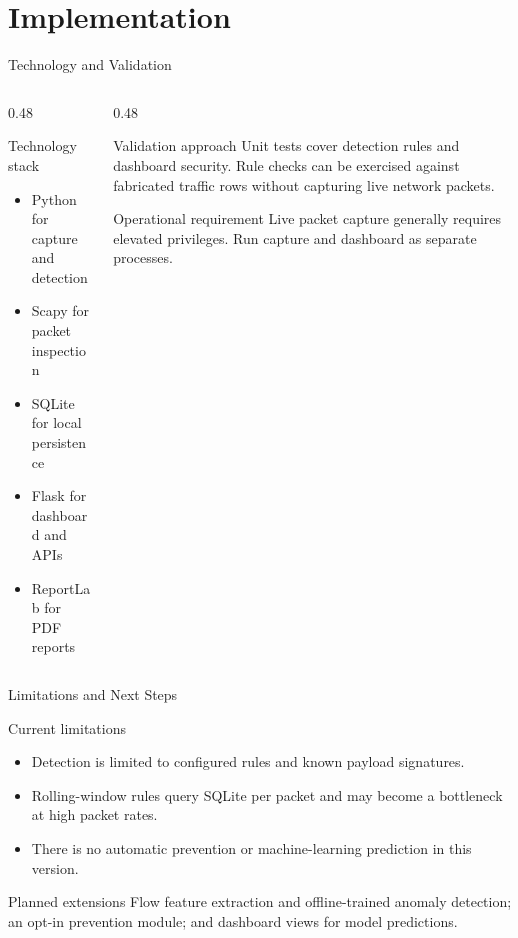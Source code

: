 \documentclass{SKP-beamer}
\begin{document}
\section{Implementation}
\begin{frame}{Technology and Validation}
\begin{columns}[T]
\begin{column}{0.48\textwidth}
\begin{block}{Technology stack}
\begin{itemize}
  \item Python for capture and detection
  \item Scapy for packet inspection
  \item SQLite for local persistence
  \item Flask for dashboard and APIs
  \item ReportLab for PDF reports
\end{itemize}
\end{block}
\end{column}
\begin{column}{0.48\textwidth}
\begin{block}{Validation approach}
Unit tests cover detection rules and dashboard security. Rule checks can be exercised against fabricated traffic rows without capturing live network packets.
\end{block}
\begin{alertblock}{Operational requirement}
Live packet capture generally requires elevated privileges. Run capture and dashboard as separate processes.
\end{alertblock}
\end{column}
\end{columns}
\end{frame}

\begin{frame}{Limitations and Next Steps}
\begin{block}{Current limitations}
\begin{itemize}
  \item Detection is limited to configured rules and known payload signatures.
  \item Rolling-window rules query SQLite per packet and may become a bottleneck at high packet rates.
  \item There is no automatic prevention or machine-learning prediction in this version.
\end{itemize}
\end{block}
\begin{exampleblock}{Planned extensions}
Flow feature extraction and offline-trained anomaly detection; an opt-in prevention module; and dashboard views for model predictions.
\end{exampleblock}
\end{frame}
\end{document}
